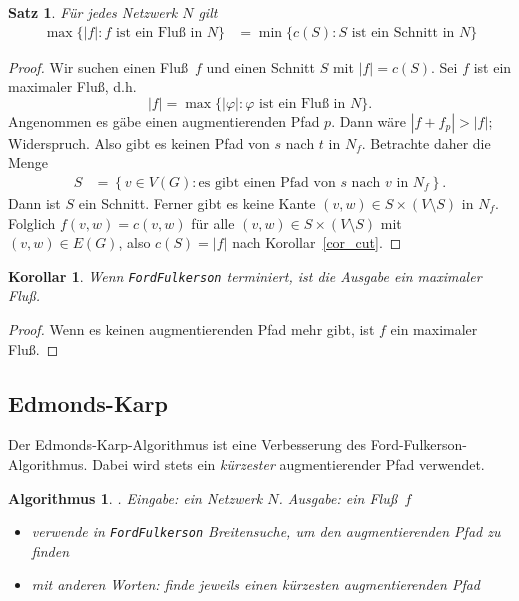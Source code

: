 \documentclass[10pt,reqno]{amsart}
\numberwithin{equation}{section}
\newtheorem{theorem}[definition]{Satz}
\newtheorem{corollary}[definition]{Korollar}
\newtheorem{algorithm}[definition]{Algorithmus}
\newcommand\cbc[1]{\left\{{#1}\right\}}
\newcommand\Cor{Korollar}
\begin{document}
\begin{theorem}\label{thm_mfmc}
	F\"ur jedes Netzwerk $N$ gilt
	\begin{align*}
		\max\{|f|:f\mbox{ ist ein Flu\ss\ in $N$}\}&=\min\{c(S):S\mbox{ ist ein Schnitt in }N\}
	\end{align*}
\end{theorem}
\begin{proof}
	Wir suchen einen Flu\ss\ $f$ und einen Schnitt $S$ mit $|f|=c(S)$.
	Sei $f$ ist ein maximaler Flu\ss, d.h.\ $$|f|=\max\{|\varphi|:\varphi\mbox{ ist ein Flu\ss\ in $N$}\}.$$
	Angenommen es g\"abe einen augmentierenden Pfad $p$.
	Dann w\"are $|f+f_p|>|f|$; Widerspruch.
	Also gibt es keinen Pfad von $s$ nach $t$ in $N_f$.
	Betrachte daher die Menge
	\begin{align*}
		S&=\cbc{v\in V(G):\mbox{es gibt einen Pfad von $s$ nach $v$ in $N_f$}}.
	\end{align*}
	Dann ist $S$ ein Schnitt.
	Ferner gibt es keine Kante $(v,w)\in S\times (V\setminus S)$ in $N_f$.
	Folglich $f(v,w)=c(v,w)$ f\"ur alle $(v,w)\in S\times (V\setminus S)$ mit $(v,w)\in E(G)$, also $c(S)=|f|$ nach \Cor~\ref{cor_cut}.
\end{proof}

\begin{corollary}\label{cor_mfmc}
	Wenn {\tt FordFulkerson} terminiert, ist die Ausgabe ein maximaler Flu\ss.
\end{corollary}
\begin{proof}
	Wenn es keinen augmentierenden Pfad mehr gibt, ist $f$ ein maximaler Flu\ss.
\end{proof}

\subsection{Edmonds-Karp}\label{sec_ek}
Der Edmonds-Karp-Algorithmus ist eine Verbesserung des Ford-Fulkerson-Algorithmus.
Dabei wird stets ein {\em k\"urzester} augmentierender Pfad verwendet.

\begin{algorithm}. {\em Eingabe:} ein Netzwerk $N$. \label{alg_ek}
	{\em Ausgabe:} ein Flu\ss\ $f$
	\begin{itemize}
		\item verwende in {\tt FordFulkerson} Breitensuche, um den augmentierenden Pfad zu finden
		\item mit anderen Worten: finde jeweils einen \emph{k\"urzesten} augmentierenden Pfad
	\end{itemize}
\end{algorithm}
\end{document}

